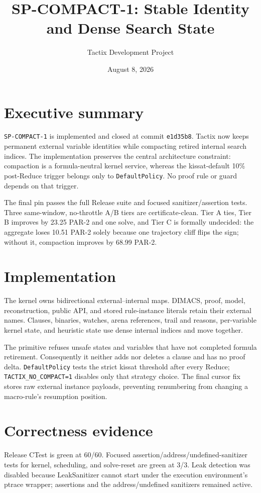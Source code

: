 \documentclass[11pt]{article}
\title{SP-COMPACT-1: Stable Identity and Dense Search State}
\author{Tactix Development Project}
\date{August 8, 2026}
\begin{document}
\maketitle

\section*{Executive summary}
\texttt{SP-COMPACT-1} is implemented and closed at commit \texttt{e1d35b8}.
Tactix now keeps permanent external variable identities while compacting
retired internal search indices.  The implementation preserves the central
architecture constraint: compaction is a formula-neutral kernel service,
whereas the kissat-default 10\% post-Reduce trigger belongs only to
\texttt{DefaultPolicy}.  No proof rule or guard depends on that trigger.

The final pin passes the full Release suite and focused sanitizer/assertion
tests.  Three same-window, no-throttle A/B tiers are certificate-clean.  Tier A
ties, Tier B improves by 23.25 PAR-2 and one solve, and Tier C is formally
undecided: the aggregate loses 10.51 PAR-2 solely because one trajectory cliff
flips the sign; without it, compaction improves by 68.99 PAR-2.

\section{Implementation}
The kernel owns bidirectional external--internal maps.  DIMACS, proof, model,
reconstruction, public API, and stored rule-instance literals retain their
external names.  Clauses, binaries, watches, arena references, trail and
reasons, per-variable kernel state, and heuristic state use dense internal
indices and move together.

The primitive refuses unsafe states and variables that have not completed
formula retirement.  Consequently it neither adds nor deletes a clause and
has no proof delta.  \texttt{DefaultPolicy} tests the strict kissat threshold
after every Reduce; \texttt{TACTIX\_NO\_COMPACT=1} disables only that strategy
choice.  The final cursor fix stores raw external instance payloads, preventing
renumbering from changing a macro-rule's resumption position.

\section{Correctness evidence}
Release CTest is green at 60/60.  Focused assertion/address/undefined-sanitizer
tests for kernel, scheduling, and solve-reset are green at 3/3.  Leak detection
was disabled because LeakSanitizer cannot start under the execution
environment's ptrace wrapper; assertions and the address/undefined sanitizers
remained active.
\end{document}
